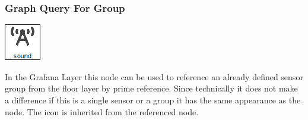 \subsubsection{Graph Query For Group}
\noindent\begin{minipage}{0.15\textwidth}%
\includegraphics[width=\linewidth]{assets/images/group2}
\end{minipage}%
\hfill%
\begin{minipage}{0.8\textwidth}
In the Grafana Layer this node can be used to reference an already defined sensor group from the floor layer by prime reference. Since technically it does not make a difference if this is a single sensor or a group it has the same appearance as the  node. The icon is inherited from the referenced node.
\end{minipage}


